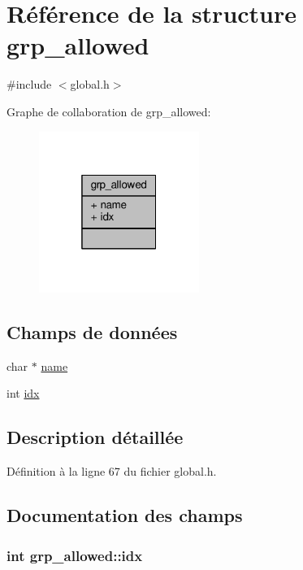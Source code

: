 \hypertarget{structgrp__allowed}{\section{Référence de la structure grp\+\_\+allowed}
\label{structgrp__allowed}
}


{\ttfamily \#include $<$global.\+h$>$}



Graphe de collaboration de grp\+\_\+allowed\+:\nopagebreak
\begin{figure}[H]
\begin{center}
\leavevmode
\includegraphics[width=148pt]{structgrp__allowed__coll__graph}
\end{center}
\end{figure}
\subsection*{Champs de données}
\begin{DoxyCompactItemize}
\item 
char $\ast$ \hyperlink{structgrp__allowed_a6b9ee6d59b5d30d4554f4e12f2423c3d}{name}
\item 
int \hyperlink{structgrp__allowed_a69c27003f96e86007bdcdf39c825306d}{idx}
\end{DoxyCompactItemize}


\subsection{Description détaillée}


Définition à la ligne 67 du fichier global.\+h.



\subsection{Documentation des champs}
\hypertarget{structgrp__allowed_a69c27003f96e86007bdcdf39c825306d}{
\subsubsection[{idx}]{\setlength{\rightskip}{0pt plus 5cm}int grp\+\_\+allowed\+::idx}}\label{structgrp__allowed_a69c27003f96e86007bdcdf39c825306d}


